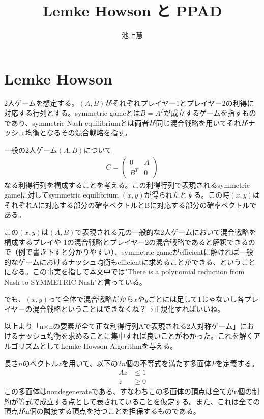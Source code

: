 \documentclass{jsarticle}
\begin{document}
\title{Lemke Howson と PPAD}
\author{池上慧}
\maketitle

\section{Lemke Howson}

2人ゲームを想定する。$(A, B)$がそれぞれプレイヤー1とプレイヤー2の利得に対応する行列とする。symmetric gameとは$B = A^T$が成立するゲームを指すものであり、symmetric Nash equilibriumとは両者が同じ混合戦略を用いてそれがナッシュ均衡となるその混合戦略を指す。

一般の2人ゲーム$(A,B)$について
\begin{align}
	C = \begin{pmatrix}
			0 & A \\
			B^T & 0 
		\end{pmatrix}
\end{align}
なる利得行列を構成することを考える。この利得行列で表現されるsymmetric gameに対してsymmetric equilibrium $(x, y)$が得られたとする。この時$(x, y)$はそれぞれAに対応する部分の確率ベクトルとBに対応する部分の確率ベクトルである。

この$(x, y)$は$(A, B)$で表現される元の一般的な2人ゲームにおいて混合戦略を構成するプレイや-1の混合戦略とプレイヤー2の混合戦略であると解釈できるので（例で書き下すと分かりやすい）、symmetric gameがefficientに解ければ一般的なゲームにおけるナッシュ均衡もefficientに求めることができる、ということになる。この事実を指して本文中では"There is a polynomial reduction from Nash to SYMMETRIC Nash"と言っている。

でも、$(x, y)$って全体で混合戦略だから$x$や$y$ごとには足して1じゃないし各プレイヤーの混合戦略ということはできなくね？→正規化すればいいね。

以上より「n×nの要素が全て正な利得行列Aで表現される2人対称ゲーム」におけるナッシュ均衡を求めることに集中すれば良いことがわかった。これを解くアルゴリズムとしてLemke-Howson Algorithmを与える。

長さ$n$のベクトル$z$を用いて、以下の$2n$個の不等式を満たす多面体$P$を定義する。
\begin{align}
	Az &\leq 1\\
	z &\geq 0
\end{align}
この多面体はnondegenerateである、すなわちこの多面体の頂点は全てがn個の制約が等式で成立する点として表されていることを仮定する。また、これは全ての頂点がn個の隣接する頂点を持つことを担保するものである。
\end{document}

